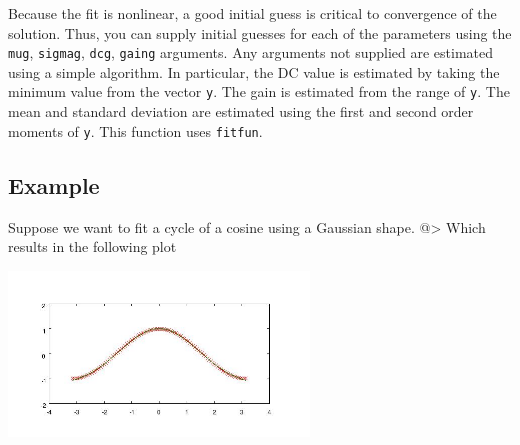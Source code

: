 Because the fit is nonlinear, a good initial guess is critical to
convergence of the solution.  Thus, you can supply initial guesses
for each of the parameters using the \verb|mug|, \verb|sigmag|, \verb|dcg|, 
\verb|gaing| arguments.  Any arguments not supplied are estimated using 
a simple algorithm. In particular, the DC value is estimated by 
taking the minimum value  from the vector \verb|y|.  The gain is 
estimated from the range of \verb|y|.  The mean and standard deviation 
are estimated using the first and second order moments of \verb|y|.
This function uses \verb|fitfun|.
\subsection{Example}

Suppose we want to fit a cycle of a cosine using a Gaussian shape.
@>
Which results in the following plot


\centerline{\includegraphics[width=8cm]{gausfit1}}

